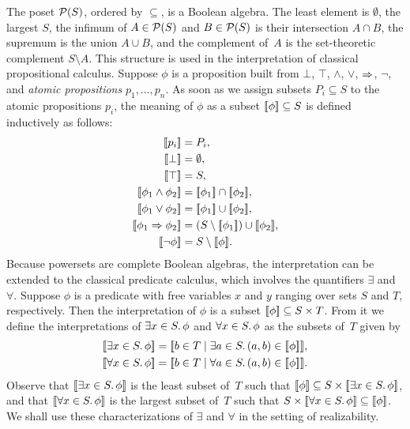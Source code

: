 The poset $\mathcal{P}(S)$, ordered by $\subseteq$, is a Boolean algebra. The
least element is $\emptyset$, the largest $S$, the infimum of $A \in
\mathcal{P}(S)$ and $B \in \mathcal{P}(S)$ is their intersection $A \cap B$, the
supremum is the union $A \cup B$, and the complement of~$A$ is the
set-theoretic complement $S \setminus A$. This structure is used in
the interpretation of classical propositional calculus. Suppose $\phi$
is a proposition built from $\bot$, $\top$, $\land$, $\lor$,
$\Rightarrow$, $\lnot$, and \emph{atomic propositions} $p_1, \ldots,
p_n$. As soon as we assign subsets $P_i \subseteq S$ to the atomic
propositions $p_i$, the meaning of $\phi$ as a subset $[\![\phi]\!]
\subseteq S$ is defined inductively as follows:
%
\begin{align*}
  \sem{p_i} &= P_i,\\
  \sem{\bot} &= \emptyset,\\
  \sem{\top} &= S,\\
  \sem{\phi_1 \land \phi_2} &= \sem{\phi_1} \cap \sem{\phi_2},\\
  \sem{\phi_1 \lor \phi_2} &= \sem{\phi_1} \cup \sem{\phi_2},\\
  \sem{\phi_1 \lthen \phi_2} &= (S \setminus \sem{\phi_1}) \cup \sem{\phi_2},\\
  \sem{\lnot \phi} &= S \setminus \sem{\phi}.
\end{align*}
%
Because powersets are complete Boolean algebras,
the interpretation can be extended to the classical predicate
calculus, which involves the quantifiers $\exists$ and $\forall$.
Suppose $\phi$ is a predicate with free variables $x$ and $y$ ranging
over sets $S$ and $T$, respectively. Then the interpretation of $\phi$
is a subset $[\![\phi]\!] \subseteq S \times T$. From it we define the
interpretations of $\exists x \in S .\,{\phi}$ and $\forall x \in S .\,{\phi}$ as
the subsets of~$T$ given by
%
\begin{align*}
  \sem{\some{x \in S}{\phi}} &=
  \sem{b \in T \such \some{a \in S}{(a,b) \in \sem{\phi}}}, \\
  \sem{\all{x \in S}{\phi}} &=
  \sem{b \in T \such \all{a \in S}{(a,b) \in \sem{\phi}}}.
\end{align*}
%
Observe that $[\![\exists x \in S .\,{\phi}]\!]$ is the least subset of~$T$
such that $[\![\phi]\!] \subseteq S \times [\![\exists x \in S .\,{\phi}]\!]$,
and that $[\![\forall x \in S .\,{\phi}]\!]$ is the largest subset of~$T$ such
that $S \times [\![\forall x \in S .\,{\phi}]\!] \subseteq [\![\phi]\!]$. We shall
use these characterizations of $\exists$ and $\forall$ in the setting
of realizability.

